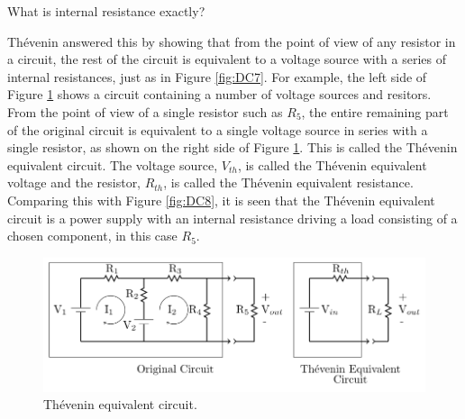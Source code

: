 \documentclass[12pt, a4paper, oneside, openright, titlepage]{book}
\begin{document}
\begin{qst}
    What is internal resistance exactly?
\end{qst}

Th\'{e}venin answered this by showing that from the point of view of any resistor in a circuit, the rest of the circuit is equivalent to a voltage source with a series of internal resistances, just as in Figure \ref{fig:DC7}. For example, the left side of Figure \ref{fig:DC9} shows a circuit containing a number of voltage sources and resitors. From the point of view of a single resistor such as $R_5$, the entire remaining part of the original circuit is equivalent to a single voltage source in series with a single resistor, as shown on the right side of Figure \ref{fig:DC9}. This is called the Th\'{e}venin equivalent circuit. The voltage source, $V_{th}$, is called the Th\'{e}venin equivalent voltage and the resistor, $R_{th}$, is called the Th\'{e}venin equivalent resistance. Comparing this with Figure \ref{fig:DC8}, it is seen that the Th\'{e}venin equivalent circuit is a power supply with an internal resistance driving a load consisting of a chosen component, in this case $R_5$.

\begin{figure}[H]
    \centering
    \includegraphics[scale = 0.8]{Images/DC9.PNG}
    \caption{Th\'{e}venin equivalent circuit.}
    \label{fig:DC9}
\end{figure}
\end{document}
